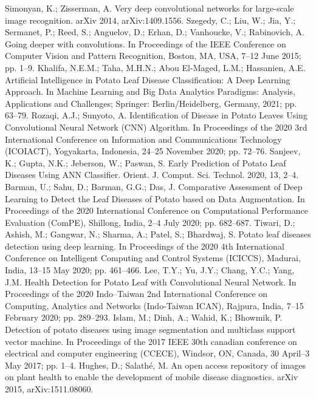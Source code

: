 \documentclass[11pt]{report}
\begin{document}
\begin{thebibliography}{100}
	 Simonyan, K.; Zisserman, A. Very deep convolutional networks for large-scale image recognition. arXiv 2014, arXiv:1409.1556.
	 Szegedy, C.; Liu, W.; Jia, Y.; Sermanet, P.; Reed, S.; Anguelov, D.; Erhan, D.; Vanhoucke, V.; Rabinovich, A. Going deeper with
	convolutions. In Proceedings of the IEEE Conference on Computer Vision and Pattern Recognition, Boston, MA, USA, 7–12 June
	2015; pp. 1–9.
	 Khalifa, N.E.M.; Taha, M.H.N.; Abou El-Maged, L.M.; Hassanien, A.E. Artificial Intelligence in Potato Leaf Disease Classification:
	A Deep Learning Approach. In Machine Learning and Big Data Analytics Paradigms: Analysis, Applications and Challenges; Springer:
	Berlin/Heidelberg, Germany, 2021; pp. 63–79.
	 Rozaqi, A.J.; Sunyoto, A. Identification of Disease in Potato Leaves Using Convolutional Neural Network (CNN) Algorithm. In
	Proceedings of the 2020 3rd International Conference on Information and Communications Technology (ICOIACT), Yogyakarta,
	Indonesia, 24–25 November 2020; pp. 72–76.
	 Sanjeev, K.; Gupta, N.K.; Jeberson, W.; Paswan, S. Early Prediction of Potato Leaf Diseases Using ANN Classifier. Orient. J.
	Comput. Sci. Technol. 2020, 13, 2–4.
	 Barman, U.; Sahu, D.; Barman, G.G.; Das, J. Comparative Assessment of Deep Learning to Detect the Leaf Diseases of Potato
	based on Data Augmentation. In Proceedings of the 2020 International Conference on Computational Performance Evaluation
	(ComPE), Shillong, India, 2–4 July 2020; pp. 682–687.
	 Tiwari, D.; Ashish, M.; Gangwar, N.; Sharma, A.; Patel, S.; Bhardwaj, S. Potato leaf diseases detection using deep learning. In
	Proceedings of the 2020 4th International Conference on Intelligent Computing and Control Systems (ICICCS), Madurai, India,
	13–15 May 2020; pp. 461–466.
	 Lee, T.Y.; Yu, J.Y.; Chang, Y.C.; Yang, J.M. Health Detection for Potato Leaf with Convolutional Neural Network. In Proceedings
	of the 2020 Indo–Taiwan 2nd International Conference on Computing, Analytics and Networks (Indo-Taiwan ICAN), Rajpura,
	India, 7–15 February 2020; pp. 289–293.
	 Islam, M.; Dinh, A.; Wahid, K.; Bhowmik, P. Detection of potato diseases using image segmentation and multiclass support
	vector machine. In Proceedings of the 2017 IEEE 30th canadian conference on electrical and computer engineering (CCECE),
	Windsor, ON, Canada, 30 April–3 May 2017; pp. 1–4.
	 Hughes, D.; Salathé, M. An open access repository of images on plant health to enable the development of mobile disease
	diagnostics. arXiv 2015, arXiv:1511.08060.

\end{thebibliography}
\end{document}
